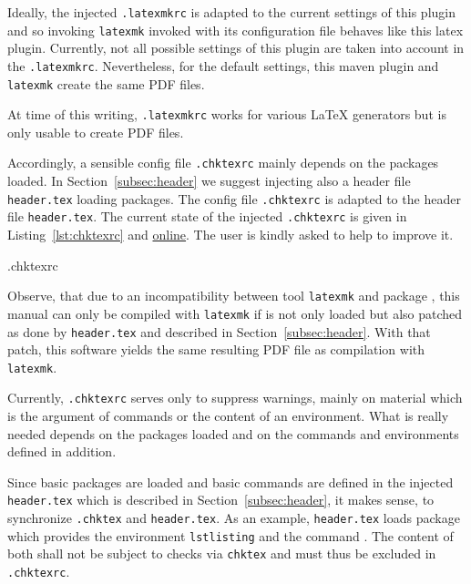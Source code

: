 Ideally, the injected \texttt{.latexmkrc} is adapted to the current settings of this plugin 
and so invoking \texttt{latexmk} invoked with its configuration file 
behaves like this latex plugin. 
Currently, not all possible settings of this plugin 
are taken into account in the \texttt{.latexmkrc}. 
Nevertheless, for the default settings, 
this maven plugin and \texttt{latexmk} create the same PDF files. 

At time of this writing, \texttt{.latexmkrc} works for various \LaTeX{} generators 
but is only usable to create PDF files. 

Accordingly, a sensible config file \texttt{.chktexrc} mainly depends on the packages loaded. 
In Section~\ref{subsec:header} we suggest injecting also a header file \texttt{header.tex} 
loading packages. 
The config file \texttt{.chktexrc} is adapted to the header file \texttt{header.tex}. 
The current state of the injected \texttt{.chktexrc} is given in Listing~\ref{lst:chktexrc} 
and \href{\urlSite fromTex/.chktexrc}{online}. 
The user is kindly asked to help to improve it.

%
{.chktexrc}

Observe, that due to an incompatibility between tool \texttt{latexmk} and package , 
this manual can only be compiled with \texttt{latexmk} 
if  is not only loaded but also patched 
as done by \texttt{header.tex} and described in Section~\ref{subsec:header}. 
With that patch, this software yields the same resulting PDF file 
as compilation with \texttt{latexmk}. 

Currently, \texttt{.chktexrc} serves only to suppress warnings, 
mainly on material which is the argument of commands or the content of an environment. 
What is really needed depends on the packages loaded 
and on the commands and environments defined in addition. 

Since basic packages are loaded and basic commands are defined 
in the injected \texttt{header.tex} 
which is described in Section~\ref{subsec:header}, 
it makes sense, to synchronize \texttt{.chktex} and \texttt{header.tex}. 
As an example, \texttt{header.tex} loads package  
which provides the environment \texttt{lstlisting} and the command . 
The content of both shall not be subject to checks via \texttt{chktex} 
and must thus be excluded in \texttt{.chktexrc}. 


